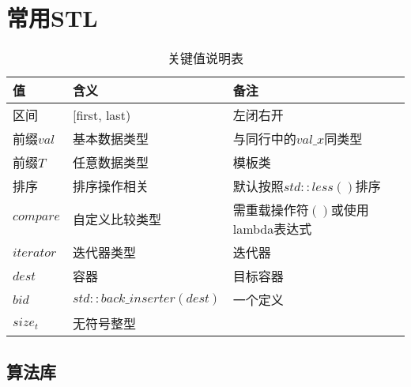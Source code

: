 \section{常用STL}

\begin{table}[htbp]
  \centering
  \caption{关键值说明表}
  \begin{tabularx}{\textwidth}{>{\raggedright\arraybackslash}X >{\centering\arraybackslash}X >{\raggedleft\arraybackslash}X}
    \toprule
    \rowcolor{headerbg}
    \textbf{值} & \textbf{含义} & \textbf{备注} \\
    \midrule
    区间 & [first, last) & 左闭右开 \\
    前缀$val$ & 基本数据类型 & 与同行中的$val\_x$同类型 \\
    前缀$T$ & 任意数据类型 & 模板类 \\
    排序 & 排序操作相关 & 默认按照$std::less()$排序 \\
    $compare$ & 自定义比较类型 & 需重载操作符$()$或使用lambda表达式 \\
    $iterator$ & 迭代器类型 & 迭代器 \\
    $dest$ & 容器 & 目标容器 \\
    $bid$ & $std::back\_inserter(dest)$ & 一个定义 \\
    $size_t$ & 无符号整型 & \\
    \bottomrule
  \end{tabularx}
\end{table}

\subsection{算法库}





















